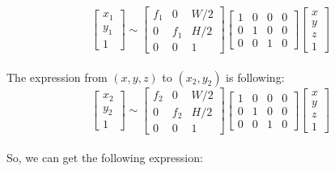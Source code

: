 \documentclass{article}
\begin{document}
\begin{equation}
	\left[
		\begin{array}{c}
		x_1 \\ y_1 \\ 1
		\end{array}
	\right] 
	\sim
	\left[
		\begin{array}{ccc}
		f_1 & 0 & W/2\\
		0 & f_1 & H/2\\
		0 & 0 & 1
		\end{array}
	\right]
	\left[
		\begin{array}{cccc}
		1 & 0 & 0 & 0\\
		0 & 1 & 0 & 0\\
		0 & 0 & 1 & 0
		\end{array}
	\right]
	\left[
		\begin{array}{c}
		x\\
		y\\
		z\\
		1
		\end{array}
	\right]
\end{equation}
\\The expression from  $\left(x, y, z\right)$ to $\left(x_2, y_2\right)$ is following:
\begin{equation}
	\left[
		\begin{array}{c}
		x_2 \\ y_2 \\ 1
		\end{array}
	\right] 
	\sim
	\left[
		\begin{array}{ccc}
		f_2 & 0 & W/2\\
		0 & f_2 & H/2\\
		0 & 0 & 1
		\end{array}
	\right]
	\left[
		\begin{array}{cccc}
		1 & 0 & 0 & 0\\
		0 & 1 & 0 & 0\\
		0 & 0 & 1 & 0
		\end{array}
	\right]
	\left[
		\begin{array}{c}
		x\\
		y\\
		z\\
		1
		\end{array}
	\right]
\end{equation}
\\So, we can get the following expression:
\end{document}
